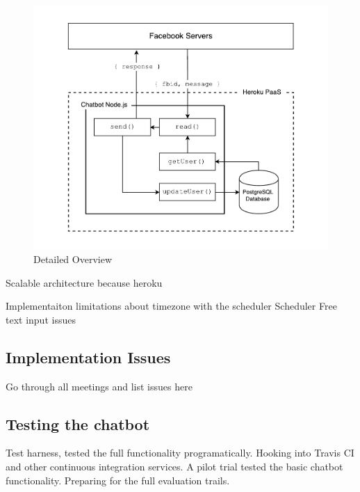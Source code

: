 \begin{figure}[H]
    \centering
    \includegraphics[width=6in]{../resources/diagrams/chatbot-detailed-overview.pdf}
    \caption{Detailed Overview}
    \label{fig:prototype_detailed_overview}
\end{figure}

Scalable architecture because heroku\newline

Implementaiton limitations about timezone with the scheduler\newline
Scheduler\newline
Free text input issues\newline

\subsection{Implementation Issues}

Go through all meetings and list issues here

\subsection{Testing the chatbot}

Test harness, tested the full functionality programatically. Hooking into Travis CI and other continuous integration services.
A pilot trial tested the basic chatbot functionality. Preparing for the full evaluation trails.

\newpage
